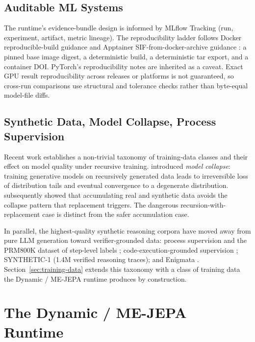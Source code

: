 \documentclass[10pt,twocolumn,letterpaper]{article}
\begin{document}
\subsection{Auditable ML Systems}

The runtime's evidence-bundle design is informed by MLflow Tracking
\citep{mlflow2024} (run, experiment, artifact, metric lineage). The
reproducibility ladder follows Docker reproducible-build guidance
\citep{docker2025reproducible} and Apptainer
SIF-from-docker-archive guidance \citep{apptainer2025buildsif}: a
pinned base image digest, a deterministic build, a deterministic
tar export, and a container DOI. PyTorch's reproducibility notes
\citep{pytorch2026reproducibility} are inherited as a caveat. Exact
GPU result reproducibility across releases or platforms is not
guaranteed, so cross-run comparisons use structural and tolerance
checks rather than byte-equal model-file diffs.

\subsection{Synthetic Data, Model Collapse, Process Supervision}

Recent work establishes a non-trivial taxonomy of training-data
classes and their effect on model quality under recursive
training. \citet{shumailov2023curse,shumailov2024nature} introduced
\emph{model collapse}: training generative models on recursively
generated data leads to irreversible loss of distribution tails and
eventual convergence to a degenerate distribution.
\citet{gerstgrasser2024accumulate} subsequently showed that
accumulating real and synthetic data avoids the collapse pattern
that replacement triggers. The dangerous recursion-with-replacement
case is distinct from the safer accumulation case.

In parallel, the highest-quality synthetic reasoning corpora have
moved away from pure LLM generation toward verifier-grounded data:
process supervision and the PRM800K dataset of step-level labels
\citep{lightman2023verify}; code-execution-grounded supervision
\citep{jung2025codeexec}; SYNTHETIC-1
\citep{primeintellect2025synthetic1} (1.4M verified reasoning
traces); and Enigmata \citep{seed2025enigmata}.
Section~\ref{sec:training-data} extends this taxonomy with a class
of training data the Dynamic / ME-JEPA runtime produces by
construction.

\section{The Dynamic / ME-JEPA Runtime}
\label{sec:method}
\end{document}
